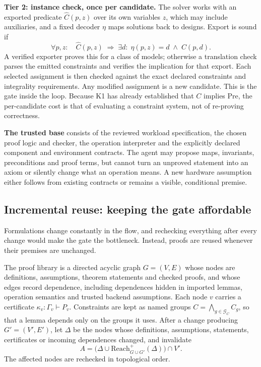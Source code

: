\documentclass[11pt]{article}
\begin{document}
\textbf{Tier 2: instance check, once per candidate.} The solver works with an exported predicate \(\widehat C(p,z)\) over its own variables \(z\), which may include auxiliaries, and a fixed decoder \(\eta\) maps solutions back to designs. Export is sound if
\[
\forall p,z:\quad \widehat C(p,z)\;\Longrightarrow\;\exists d:\;\eta(p,z)=d\;\land\;C(p,d).
\]
A verified exporter proves this for a class of models; otherwise a translation check parses the emitted constraints and verifies the implication for that export. Each selected assignment is then checked against the exact declared constraints and integrality requirements. Any modified assignment is a new candidate. This is the gate inside the loop. Because K1 has already established that \(C\) implies \(\mathrm{Pre}\), the per-candidate cost is that of evaluating a constraint system, not of re-proving correctness.

\textbf{The trusted base} consists of the reviewed workload specification, the chosen proof logic and checker, the operation interpreter and the explicitly declared component and environment contracts. The agent may propose maps, invariants, preconditions and proof terms, but cannot turn an unproved statement into an axiom or silently change what an operation means. A new hardware assumption either follows from existing contracts or remains a visible, conditional premise.

\hypertarget{incremental-reuse-keeping-the-gate-affordable}{%
\subsection{Incremental reuse: keeping the gate affordable}\label{incremental-reuse-keeping-the-gate-affordable}}

Formulations change constantly in the flow, and rechecking everything after every change would make the gate the bottleneck. Instead, proofs are reused whenever their premises are unchanged.

The proof library is a directed acyclic graph \(G=(V,E)\) whose nodes are definitions, assumptions, theorem statements and checked proofs, and whose edges record dependence, including dependences hidden in imported lemmas, operation semantics and trusted backend assumptions. Each node \(v\) carries a certificate \(\kappa_v:\Gamma_v\vdash P_v\). Constraints are kept as named groups \(C=\bigwedge_{g\in\mathcal G_C}C_g\), so that a lemma depends only on the groups it uses. After a change producing \(G'=(V',E')\), let \(\Delta\) be the nodes whose definitions, assumptions, statements, certificates or incoming dependences changed, and invalidate
\[
A=\bigl(\Delta\cup\mathrm{Reach}^{+}_{G\cup G'}(\Delta)\bigr)\cap V'.
\]
The affected nodes are rechecked in topological order.
\end{document}
